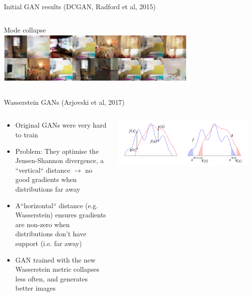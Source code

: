 \documentclass[8pt,xcolor=table,aspectratio=169]{beamer}
\begin{document}
\begin{frame}{Initial GAN results (DCGAN, Radford et al, 2015)}
\begin{columns}
\begin{column}{0.5\textwidth}
Mode collapse\\
\includegraphics[width=0.75\textwidth]{QSBCbu0.png}

\end{column}
\end{columns}

\end{frame}

\begin{frame}{Wasserstein GANs (Arjovski et al, 2017)}


\begin{columns}
\begin{column}{0.5\textwidth}

\begin{itemize}
\item Original GANs were very hard to train

\vspace{2em} 

\item Problem: They optimise the Jensen-Shannon divergence, a ``vertical`` distance $\to$ no good gradients when distributions far away
 
\vspace{2em} 
 
\item A``horizontal`` distance (e.g. Wasserstein) ensures gradients are non-zero when distributions don't have support (i.e. far away)
 
 \vspace{2em} 
 
 \item GAN trained with the new Wasserstein metric collapses less often, and generates better images
 

\end{itemize}

\end{column}
\begin{column}{0.5\textwidth}
\centering
\includegraphics[width=\textwidth]{wasserstein}


\end{column}
\end{columns}
\end{frame}
\end{document}
